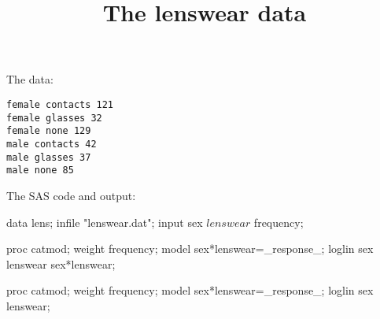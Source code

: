 \documentclass{article}
\title{The lenswear data}
\begin{document}
\maketitle
The data:
\begin{verbatim}
female contacts 121
female glasses 32
female none 129
male contacts 42
male glasses 37
male none 85
\end{verbatim}
The SAS code and output:
\begin{Winput}
data lens;
infile "lenswear.dat";
input sex $ lenswear $ frequency;

proc catmod;
weight frequency;
model sex*lenswear=_response_;
loglin sex lenswear sex*lenswear;

proc catmod;
  weight frequency;
  model sex*lenswear=_response_;
  loglin sex lenswear;









\end{Winput}
\end{document}

